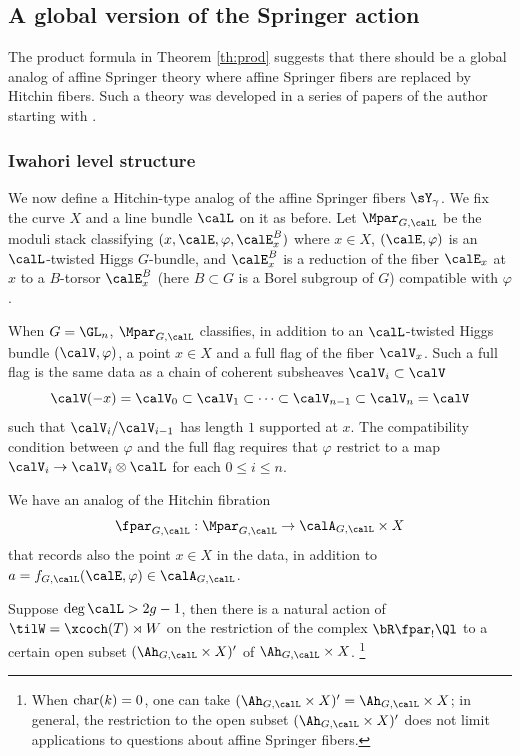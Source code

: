 \subsection{A global version of the Springer action}

The product formula in Theorem \ref{th:prod} suggests that there should be a global analog of affine Springer theory where affine Springer fibers are replaced by Hitchin fibers. Such a theory was developed in a series of papers of the author starting with \cite{GS}.

\subsubsection{Iwahori level structure} We now define a Hitchin-type analog of the affine Springer fibers $\sY_{\gamma}$. We fix the curve $X$ and a line bundle $\calL$ on it as before. Let $\Mpar_{G,\calL}$ be the moduli stack classifying $(x,\calE,\varphi, \calE^{B}_{x})$ where $x\in X$, $(\calE,\varphi)$ is an $\calL$-twisted Higgs $G$-bundle, and $\calE^{B}_{x}$ is a reduction of the fiber $\calE_{x}$ at $x$ to a $B$-torsor $\calE^{B}_{x}$ (here $B\subset G$ is a Borel subgroup of $G$) compatible with $\varphi$. 

When $G=\GL_{n}$, $\Mpar_{G,\calL}$ classifies, in addition to an $\calL$-twisted Higgs bundle $(\calV,\varphi)$, a point $x\in X$ and a full flag of the fiber $\calV_{x}$. Such a full flag is the same data as a chain of coherent subsheaves $\calV_{i}\subset\calV$
\begin{equation*}
\calV(-x)=\calV_{0}\subset \calV_{1}\subset\cdots\subset\calV_{n-1}\subset\calV_{n}=\calV
\end{equation*}
such that $\calV_{i}/\calV_{i-1}$ has length $1$ supported at $x$. The compatibility condition between $\varphi$ and the full flag requires that $\varphi$ restrict to a map $\calV_{i}\to\calV_{i}\otimes\calL$ for each $0\leq i\leq n$. 

We have an analog of the Hitchin fibration
\begin{equation*}
\fpar_{G,\calL}:\Mpar_{G,\calL}\to \calA_{G,\calL}\times X
\end{equation*}
that records also the point $x\in X$ in the data, in addition to $a=f_{G,\calL}(\calE,\varphi)\in\calA_{G,\calL}$.

\begin{theorem}\label{th:GS} Suppose $\deg\calL>2g-1$, then there is a natural action of $\tilW=\xcoch(T)\rtimes W$ on the restriction of the complex $\bR\fpar_{!}\Ql$ to a certain open subset $(\Ah_{G,\calL}\times X)'$ of $\Ah_{G,\calL}\times X$. \footnote{When $\textup{char}(k)=0$, one can take $(\Ah_{G,\calL}\times X)'=\Ah_{G,\calL}\times X$; in general, the restriction to the open subset $(\Ah_{G,\calL}\times X)'$ does not limit applications to questions about affine Springer fibers.}
\end{theorem}

